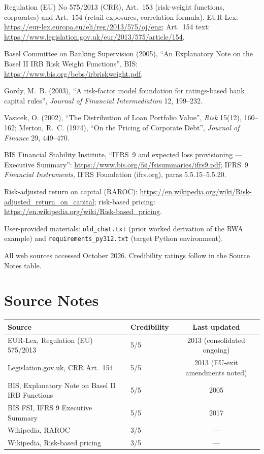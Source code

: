 \documentclass[11pt,a4paper]{report}
\theoremstyle{definition}
\theoremstyle{plain}
\begin{document}
\begin{enumerate}[label={[\arabic*]}]
\item Regulation (EU) No 575/2013 (CRR), Art.~153 (risk-weight
      functions, corporates) and Art.~154 (retail exposures,
      correlation formula). EUR-Lex:
      \url{https://eur-lex.europa.eu/eli/reg/2013/575/oj/eng};
      Art.~154 text:
      \url{https://www.legislation.gov.uk/eur/2013/575/article/154}.
\item Basel Committee on Banking Supervision (2005), ``An Explanatory
      Note on the Basel II IRB Risk Weight Functions'', BIS:
      \url{https://www.bis.org/bcbs/irbriskweight.pdf}.
\item Gordy, M.~B. (2003), ``A risk-factor model foundation for
      ratings-based bank capital rules'', \emph{Journal of Financial
      Intermediation} 12, 199--232.
\item Vasicek, O. (2002), ``The Distribution of Loan Portfolio
      Value'', \emph{Risk} 15(12), 160--162; Merton, R.~C. (1974),
      ``On the Pricing of Corporate Debt'', \emph{Journal of Finance}
      29, 449--470.
\item BIS Financial Stability Institute, ``IFRS~9 and expected loss
      provisioning --- Executive Summary'':
      \url{https://www.bis.org/fsi/fsisummaries/ifrs9.pdf};
      IFRS~9 \emph{Financial Instruments}, IFRS Foundation
      (ifrs.org), paras 5.5.15--5.5.20.
\item Risk-adjusted return on capital (RAROC):
      \url{https://en.wikipedia.org/wiki/Risk-adjusted_return_on_capital};
      risk-based pricing:
      \url{https://en.wikipedia.org/wiki/Risk-based_pricing}.
\item User-provided materials: \texttt{old\_chat.txt} (prior worked
      derivation of the RWA example) and
      \texttt{requirements\_py312.txt} (target Python environment).
\end{enumerate}

All web sources accessed October 2026. Credibility ratings follow in
the Source Notes table.

\section*{Source Notes}

\begin{center}
\begin{tabular}{llc}
\toprule
Source & Credibility & Last updated\\
\midrule
EUR-Lex, Regulation (EU) 575/2013 & 5/5 & 2013 (consolidated ongoing)\\
Legislation.gov.uk, CRR Art.~154 & 5/5 & 2013 (EU-exit amendments noted)\\
BIS, Explanatory Note on Basel II IRB Functions & 5/5 & 2005\\
BIS FSI, IFRS 9 Executive Summary & 5/5 & 2017\\
Wikipedia, RAROC & 3/5 & ---\\
Wikipedia, Risk-based pricing & 3/5 & ---\\
\bottomrule
\end{tabular}
\end{center}
\end{document}

